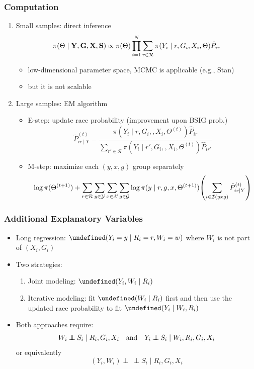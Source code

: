 \documentclass{beamer}
\let\Pr\undefined
\DeclareMathOperator{\Pr}{\mathbb{P}}
\newcommand{\indep}{\mathbin{\perp\!\!\!\!\!\:\perp}}
\newcommand{\cR}{\mathcal{R}}
\newcommand{\cG}{\mathcal{G}}
\newcommand{\cX}{\mathcal{X}}
\newcommand{\cY}{\mathcal{Y}}
\newcommand{\cI}{\mathcal{I}}
\begin{document}
\begin{frame}

  \frametitle{Computation}

  \begin{enumerate}
  \item Small samples: \alert{direct inference}
$$
    \pi(\Theta\mid \vb Y, \vb G, \vb X, \vb S)
    \propto \pi(\Theta) \prod_{i=1}^N \sum_{r\in\cR} \pi(Y_i\mid 
    r, G_i, X_i, \Theta)\hat{P}_{ir}
    $$
    \begin{itemize}
    \item low-dimensional parameter space, MCMC is applicable (e.g.,
      Stan)
    \item but it is not scalable
    \end{itemize}
    
  \item Large samples: \alert{EM algorithm}
    \begin{itemize}
    \item E-step: update race probability (improvement upon BSIG prob.)
      $$\tilde{P}_{ir\mid Y}^{(t)}
    = \frac{\pi(Y_i\mid r, G_i,, X_i, \Theta^{(t)}) \hat P_{ir}}{
        \sum_{r'\in\cR} \pi(Y_i\mid r', G_i,, X_i, \Theta^{(t)}) \hat P_{ir'} }$$
    \item M-step: maximize each $(y,x,g)$ group separately
      $$\log \pi(\Theta^{(t+1)}) + \sum_{r\in\cR}\sum_{y\in\cY}\sum_{x\in\cX}\sum_{g\in\cG} 
        \log \pi(y\mid r, g, x, \Theta^{(t+1)}) 
        \qty(\sum_{i\in\cI(yxg)} \tilde{P}_{ir\mid Y}^{(t)}) $$
    \end{itemize}

  \end{enumerate}

\end{frame}

\begin{frame}

  \frametitle{Additional Explanatory Variables}

  \begin{itemize}
  \item Long regression: $\Pr(Y_i  = y \mid R_i = r, W_i = w)$ where
    $W_i$ is not part of $(X_i, G_i)$
\vfill
  \item Two strategies:
    \begin{enumerate}
    \item Joint modeling: $\Pr(Y_i, W_i \mid R_i)$
    \item Iterative modeling: fit $\Pr(W_i \mid R_i)$ first and then use the
      updated race probability to fit $\Pr(Y_i \mid W_i, R_i)$
    \end{enumerate}
\vfill
\item Both approaches require:
   $$W_i\indep S_i\mid R_i,G_i,X_i \qand
   Y_i\indep S_i\mid W_i,R_i,G_i,X_i$$
   or equivalently
   $$(Y_i, W_i)\indep S_i\mid R_i,G_i,X_i$$
   \vspace{-.4in}
  \end{itemize}

\end{frame}
\end{document}
